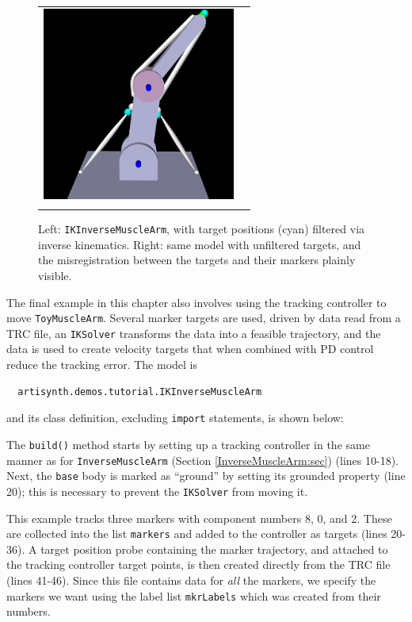 \begin{figure}[ht]
\begin{center}
\begin{tabular}{cc}
   \includegraphics[width=2.5in]{images/IKInverseMuscleArm1}\\
\fi
\end{tabular}
\end{center}
\caption{Left: {\tt IKInverseMuscleArm}, with target positions (cyan)
filtered via inverse kinematics. Right: same model with unfiltered targets, and
the misregistration between the targets and their markers plainly visible.}
\label{IKInverseMuscleArm:fig}
\end{figure}

The final example in this chapter also involves using the tracking controller
to move {\tt ToyMuscleArm}. Several marker targets are used, driven by data
read from a TRC file, an {\tt IKSolver} transforms the data into a feasible
trajectory, and the data is used to create velocity targets that when combined
with PD control reduce the tracking error. The model is
%
\begin{verbatim}
  artisynth.demos.tutorial.IKInverseMuscleArm
\end{verbatim}
%
and its class definition, excluding {\tt import} statements, is shown below:
%
\lstset{numbers=left}
\iflatexml

\else

\fi
\lstset{numbers=none}
%
The {\tt build()} method starts by setting up a tracking controller in the same
manner as for {\tt InverseMuscleArm} (Section \ref{InverseMuscleArm:sec})
(lines 10-18). Next, the {\tt base} body is marked as ``ground'' by setting its
{\sf grounded} property (line 20); this is necessary to prevent the {\tt IKSolver}
from moving it.

This example tracks three markers with component numbers 8, 0, and 2.  These
are collected into the list {\tt markers} and added to the controller as
targets (lines 20-36). A target position probe containing the marker
trajectory, and attached to the tracking controller target points, is then
created directly from the TRC file (lines 41-46). Since this file contains data
for {\it all} the markers, we specify the markers we want using the label
list {\tt mkrLabels} which was created from their numbers.

